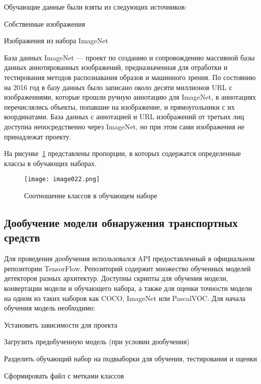 Обучающие данные были взяты из следующих источников:
%
\begin{itemize*}
  \item Собственные изображения
  \item Изображения из набора ImageNet\cite{nineteen}
\end{itemize*}
%

База данных ImageNet — проект по созданию и сопровождению массивной базы данных аннотированных изображений, предназначенная для отработки и тестирования методов распознавания образов и машинного зрения. По состоянию на 2016 год в базу данных было записано около десяти миллионов URL с изображениями, которые прошли ручную аннотацию для ImageNet, в аннотациях перечислялись объекты, попавшие на изображение, и прямоугольники с их координатами. База данных с аннотацией и URL изображений от третьих лиц доступна непосредственно через ImageNet, но при этом сами изображения не принадлежат проекту.

На рисунке~\ref{fig:datasubsetproportions} представлены пропорции, в которых содержатся определенные классы в обучающих наборах.

\begin{figure}[htbp]
\centering
\texttt{[image: image022.png]}
\caption{Соотношение классов в обучающем наборе}%
\label{fig:datasubsetproportions}
\end{figure}

\subsection{Дообучение модели обнаружения транспортных средств}

Для проведения дообучения использовался API предоставленный в официальном репозитории TensorFlow\cite{twenty}. Репозиторий содержит множество обученных моделей детекторов разных архитектур. Доступны скрипты для обучения модели, конвертации модели и обучающего набора, а также для оценки точности модели на одном из таких наборов как COCO, ImageNet или PascalVOC. Для начала обучения модель необходимо:
%
\begin{itemize*}
  \item Установить зависимости для проекта
  \item Загрузить предобученную модель (при условии дообучения)
  \item Разделить обучающий набор на подвыборки для обучения, тестирования и оценки
  \item Сформировать файл с метками классов
\end{itemize*}
%

